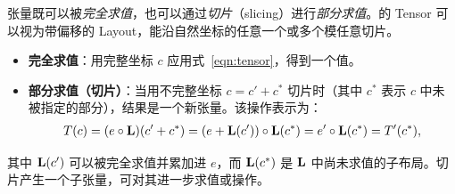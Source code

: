 

\label{sec:slicing}

张量既可以被{\em 完全求值}，也可以通过{\em 切片}（slicing）进行{\em 部分求值}。\CuTe 的 Tensor 可以视为带偏移的 Layout，能沿自然坐标的任意一个或多个模任意切片。

\begin{itemize}[itemsep=0pt,topsep=2pt]
\item \textbf{完全求值}：用完整坐标 $c$ 应用式~\eqref{eqn:tensor}，得到一个值。
\item \textbf{部分求值（切片）}：当用不完整坐标 $c = c' + c^*$ 切片时（其中 $c^*$ 表示 $c$ 中未被指定的部分），结果是一个新张量。该操作表示为：
\begin{align}
T(c) = (e \circ \mathbf{L})(c'+ c^*) = (e + \mathbf{L}(c')) \circ \mathbf{L}(c^*) = e' \circ \mathbf{L}(c^*) = T'(c^*),
\end{align}
\end{itemize}
其中 $\mathbf{L}(c')$ 可以被完全求值并累加进 $e$，而 $\mathbf{L}(c^*)$ 是 $\mathbf{L}$ 中尚未求值的子布局。切片产生一个子张量，可对其进一步求值或操作。

